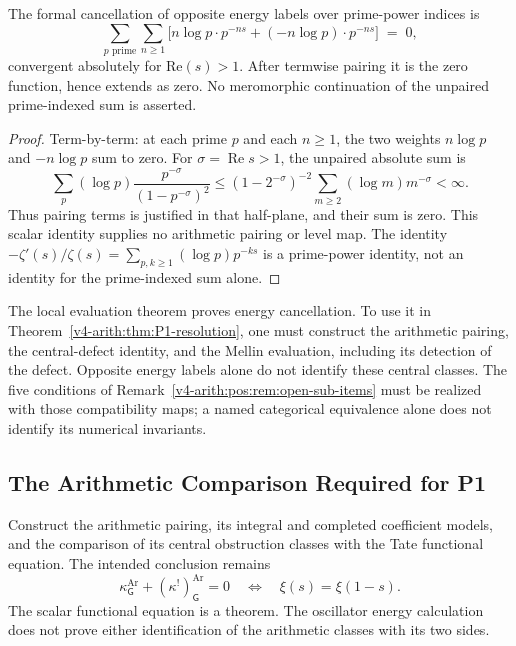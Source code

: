 \begin{proposition}
\label{v4-arith:pos:prop:global-weight}
The formal cancellation of opposite energy labels over prime-power
indices is
\begin{equation}
\sum_{p\text{ prime}}\sum_{n\geq 1}\bigl[n\log p\cdot p^{-ns}+(-n\log p)\cdot p^{-ns}\bigr]\;=\;0,
\end{equation}
convergent absolutely for \(\mathrm{Re}(s)>1\). After termwise
pairing it is the zero function, hence extends as zero. No
meromorphic continuation of the unpaired prime-indexed sum is asserted.
\end{proposition}

\begin{proof}
Term-by-term: at each prime \(p\) and each \(n\geq 1\), the two
weights \(n\log p\) and \(-n\log p\) sum to zero. For \(\sigma=\operatorname{Re}s>1\), the unpaired absolute sum is
\[
 \sum_p(\log p)\frac{p^{-\sigma}}{(1-p^{-\sigma})^2}
 \le (1-2^{-\sigma})^{-2}\sum_{m\ge2}(\log m)m^{-\sigma}<\infty.
\]
Thus pairing terms is justified in that half-plane, and their sum is
zero. This scalar identity supplies no arithmetic pairing or level map. The identity
\(-\zeta'(s)/\zeta(s)=\sum_{p,k\geq1}(\log p)p^{-ks}\) is a prime-power
identity, not an identity for the prime-indexed sum alone.
\end{proof}

\begin{remark}
\label{v4-arith:pos:cor:step-3-unconditional}
The local evaluation theorem proves energy cancellation. To use it in
Theorem~\ref{v4-arith:thm:P1-resolution}, one must construct the
arithmetic pairing, the central-defect identity, and the Mellin
evaluation, including its detection of the defect. Opposite energy
labels alone do not identify these central classes.
The five conditions of Remark~\ref{v4-arith:pos:rem:open-sub-items} must be
realized with those compatibility maps; a named categorical equivalence
alone does not identify its numerical invariants.
\end{remark}

\subsection{The Arithmetic Comparison Required for P1}
\label{v4-arith:pos:p1-closes}
\begin{question}
\label{v4-arith:pos:thm:P1-full-unconditional}
Construct the arithmetic pairing, its integral and completed coefficient
models, and the comparison of its central obstruction classes with the
Tate functional equation. The intended conclusion remains
\[
 \kappa^{\mathrm{Ar}}_{\mathsf G}+(\kappa^!)^{\mathrm{Ar}}_{\mathsf G}=0
 \quad\Longleftrightarrow\quad \xi(s)=\xi(1-s).
\]
The scalar functional equation is a theorem. The oscillator energy
calculation does not prove either identification of the arithmetic
classes with its two sides.
\end{question}

